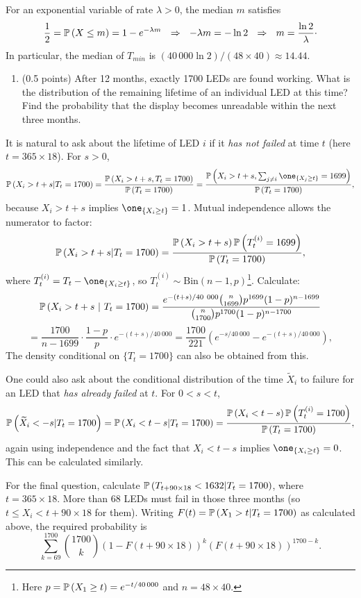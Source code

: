 \documentclass[a4paper]{report}
\begin{document}
\begin{problem}
For an exponential variable of rate $\lambda>0$, the median $m$ satisfies
$$\frac{1}{2} = \mathbb P\left( X\leq m\right) = 1-e^{-\lambda m}~~\Rightarrow~~-\lambda m = -\ln2~~\Rightarrow~~ m=\frac{\ln2}{\lambda}\cdot$$
In particular, the median of $T_{min}$ is $(40\,000\ln2)/(48\times40)\approx14.44$.
\begin{enumerate}[resume]
    \item (0.5 points) After 12 months, exactly 1700 LEDs are found working. What is the distribution of the remaining lifetime of an individual LED at this time? Find the probability that the display becomes unreadable within the next three months.
\end{enumerate}
It is natural to ask about the lifetime of LED $i$ if it \emph{has not failed} at time $t$ (here $t=365\times18$). For $s>0$, $$\Pbb{X_i>t+s|T_t=1700}=\frac{\Pbb{X_i>t+s,T_t=1700}}{\Pbb{T_t=1700}}=\frac{\Pbb{X_i>t+s,\sum_{j\neq i}\one_{\{X_j\geq t\}}=1699}}{\Pbb{T_t=1700}},$$ because $X_i>t+s$ implies $\one_{\{X_i\geq t\}}=1$. Mutual independence allows the numerator to factor: $$\mathbb P\left( X_i>t+s|T_t=1700\right)=\frac{\mathbb P\left( X_i>t+s\right)\mathbb P\left( T_t^{(i)}=1699\right)}{\mathbb P\left( T_t=1700\right)},$$ where $T_t^{(i)}=T_t-\one_{\{X_i\geq t\}}$, so $T_t^{(i)}\sim\mbox{Bin}(n-1,p)$\footnote{Here $p=\mathbb P\left( X_1\geq t\right)=e^{-t/40\,000}$ and $n=48\times40$.}. Calculate:
$$\mathbb P\left( X_i>t+s~|~T_t=1700\right) = \frac{e^{-(t+s)/40~000}\binom{n}{1699}p^{1699}(1-p)^{n-1699}}{\binom{n}{1700}p^{1700}(1-p)^{n-1700}}$$
$$= \frac{1700}{n-1699}\cdot\frac{1-p}{p}\cdot e^{-(t+s)/40~000} = \frac{1700}{221}\left(e^{-s/40~000}-e^{-(t+s)/40~000}\right),$$
The density conditional on $\{T_t=1700\}$ can also be obtained from this.

One could also ask about the conditional distribution of the time $\widetilde X_i$ to failure for an LED that \emph{has already failed} at $t$. For $0<s<t$, $$\mathbb P\left( \widetilde X_i<-s|T_t=1700\right)=\mathbb P\left( X_i<t-s|T_t=1700\right)=\frac{\mathbb P\left( X_i<t-s\right)\mathbb P\left( T_t^{(i)}=1700\right)}{\mathbb P\left( T_t=1700\right)},$$ again using independence and the fact that $X_i<t-s$ implies $\one_{\{X_i\geq t\}}=0$. This can be calculated similarly.

For the final question, calculate $\mathbb P\left( T_{t+90\times18}<1632|T_t=1700\right)$, where $t=365\times18$. More than 68 LEDs must fail in those three months (so $t\leq X_i<t+90\times18$ for them). Writing $F(t)=\mathbb P\left( X_1>t|T_t=1700\right)$ as calculated above, the required probability is
$$\sum_{k=69}^{1700}{\binom{1700}{k}\left(1-F(t+90\times18)\right)^k\left(F(t+90\times18)\right)^{1700-k}}.$$
\end{problem}
\vfill
\newpage
\end{document}
